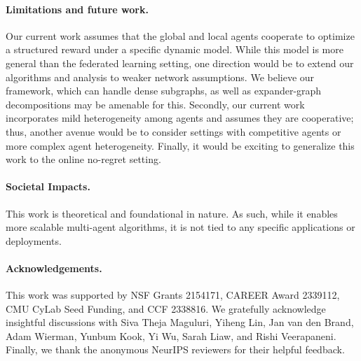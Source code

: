 \documentclass{article}
\theoremstyle{plain}
\theoremstyle{definition}
\begin{document}
\paragraph{Limitations and future work.} Our current work assumes that the global and local agents cooperate to optimize a structured reward under a specific dynamic model. While this model is more general than the federated learning setting, one direction would be to extend our algorithms and analysis to weaker network assumptions. We believe our framework, which can handle dense subgraphs, as well as expander-graph decompositions \citep{10.1145/1391289.1391291,anand2023pseudorandomness,anand2025pseudorandomnessexpanderrandomwalks} may be amenable for this. Secondly, our current work incorporates mild heterogeneity among agents and assumes they are cooperative; thus, another avenue would be to consider settings with competitive agents or more complex agent heterogeneity. Finally, it would be exciting to generalize this work to the online no-regret setting.

\paragraph{Societal Impacts.} This work is theoretical and foundational in nature. As such, while it enables more scalable multi-agent algorithms, it is not tied to any specific applications or deployments.


\paragraph{Acknowledgements.} This work was supported by NSF Grants 2154171, CAREER Award 2339112, CMU CyLab Seed Funding, and CCF 2338816. We gratefully acknowledge insightful discussions with Siva Theja Maguluri, Yiheng Lin, Jan van den Brand, Adam Wierman, Yunbum Kook, Yi Wu, Sarah Liaw, and Rishi Veerapaneni. Finally, we thank the anonymous NeurIPS reviewers for their helpful feedback. 

\newpage




\newpage
\appendix
\end{document}
